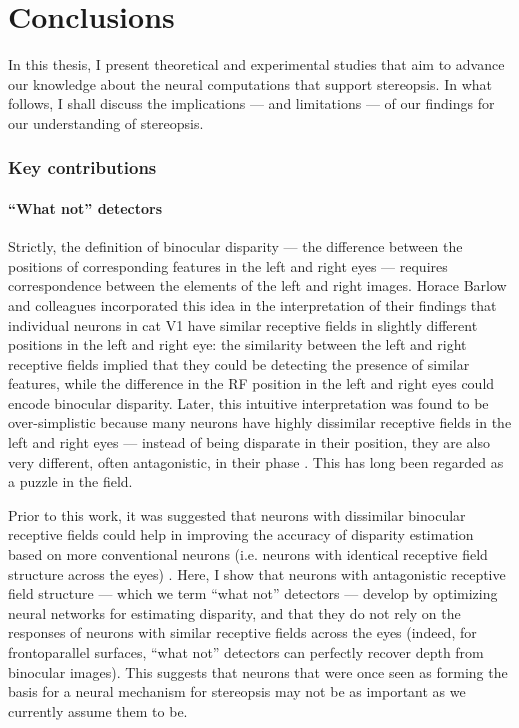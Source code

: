 \def\baselinestretch{1}
\chapter{Conclusions}
\ifpdf
    \graphicspath{{discussion/discussion-figs/PNG/}{discussion/discussion-figs/PDF/}{discussion/discussion-figs/}}
\else
    \graphicspath{{discussion/discussion-figs/EPS/}{discussion/discussion-figs/}}
\fi

\def\baselinestretch{1.66}

In this thesis, I present theoretical and experimental studies that aim to advance our knowledge about the neural computations that support stereopsis. In what follows, I shall discuss the implications --- and limitations --- of our findings for our understanding of stereopsis.


\subsection{Key contributions}


\subsubsection*{``What not'' detectors}

Strictly, the definition of binocular disparity --- the difference between the positions of corresponding features in the left and right eyes --- requires correspondence between the elements of the left and right images. Horace Barlow and colleagues \cite{Barlow:1967bs} incorporated this idea in the interpretation of their findings that individual neurons in cat V1 have similar receptive fields in slightly different positions in the left and right eye: the similarity between the left and right receptive fields implied that they could be detecting the presence of similar features, while the difference in the RF position in the left and right eyes could encode binocular disparity. Later, this intuitive interpretation was found to be over-simplistic because many neurons have highly dissimilar receptive fields in the left and right eyes --- instead of being disparate in their position, they are also very different, often antagonistic, in their phase \cite{DeAngelis:1991mb}. This has long been regarded as a puzzle in the field.

Prior to this work, it was suggested that neurons with dissimilar binocular receptive fields could help in improving the accuracy of disparity estimation based on more conventional neurons (i.e. neurons with identical receptive field structure across the eyes) \cite{Read:2007nx}. Here, I show that neurons with antagonistic receptive field structure --- which we term ``what not'' detectors --- develop by optimizing neural networks for estimating disparity, and that they do not rely on the responses of neurons with similar receptive fields across the eyes (indeed, for frontoparallel surfaces, ``what not'' detectors can perfectly recover depth from binocular images). This suggests that neurons that were once seen as forming the basis for a neural mechanism for stereopsis \cite{Barlow:1967bs} may not be as important as we currently assume them to be.

